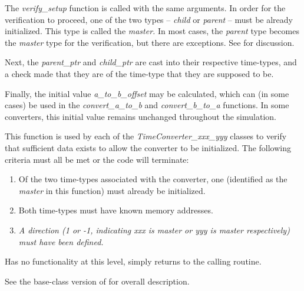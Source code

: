 {\begin{enumerate}
{\begin{enumerate}
\normalsize
The \textit{verify\_setup} function is called with the same arguments.
In order for the verification to proceed, one of the two types --
\textit{child} or \textit{parent} -- must be already initialized.  This
type is called the\textit{ master.  }In most cases, the \textit{parent}
type becomes the \textit{master} type for the verification, but there
are exceptions.  See
for discussion.

Next, the \textit{parent\_ptr} and \textit{child\_ptr} are cast into
their respective time-types, and a check made that they are of the
time-type that they are supposed to be.

Finally, the initial value \textit{a\_to\_b\_offset } may be calculated,
which can (in some cases) be used in the \textit{convert\_a\_to\_b} and
\textit{convert\_b\_to\_a} functions.  In some converters, this initial
value remains unchanged throughout the simulation.

This function is used by each of the \textit{TimeConverter\_xxx\_yyy} classes
to verify that sufficient data exists to allow the converter to be
initialized.  The following criteria must all be met or the code will
terminate:

\begin{enumerate}
\item Of the two time-types associated with the converter, one
(identified as the \textit{master }in this function) must already be
initialized.
\item Both time-types must have known memory addresses.
\item {\itshape
\textup{A direction} (1 or -1, indicating xxx is master or yyy is master
respectively) \textup{must have been }\textup{defined.  }}
\end{enumerate}

Has no functionality at this level, simply returns to the calling routine.

\end{enumerate}}



{\begin{enumerate}
\label{ref:TimeConverterdyntaiinitialize}
See the base-class version of
 for overall description.


\end{enumerate}}
\end{enumerate}}
